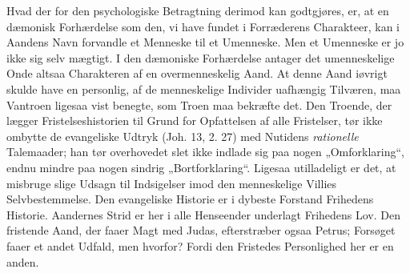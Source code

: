 \documentclass[12pt,a4paper]{book}
\begin{document}
Hvad der for den psychologiske Betragtning derimod kan godtgjøres, er, at en dæmonisk
Forhærdelse som den, vi have fundet i Forræderens Charakteer, kan i Aandens Navn forvandle et
Menneske til et Umenneske. Men et Umenneske er jo ikke sig selv mægtigt. I den dæmoniske
Forhærdelse antager det umenneskelige Onde altsaa Charakteren af en overmenneskelig Aand. At
denne Aand iøvrigt skulde have en personlig, af de menneskelige Individer uafhængig Tilværen,
maa Vantroen ligesaa vist benegte, som Troen maa bekræfte det. Den Troende, der lægger
Fristelseshistorien
til Grund for Opfattelsen af alle Fristelser, tør ikke ombytte de evangeliske Udtryk
(Joh. 13, 2. 27) med Nutidens \textit{rationelle} Talemaader; han tør overhovedet slet
ikke indlade sig paa nogen „Omforklaring“, endnu mindre paa nogen sindrig
„Bortforklaring“. Ligesaa utilladeligt er det, at misbruge slige Udsagn til Indsigelser
imod den menneskelige Villies Selvbestemmelse. Den evangeliske Historie er i dybeste
Forstand Frihedens Historie. Aandernes Strid er her i alle Henseender underlagt Frihedens
Lov. Den fristende Aand, der faaer Magt med Judas, efterstræber ogsaa Petrus; Forsøget
faaer et andet Udfald, men hvorfor? Fordi den Fristedes Personlighed her er en anden.
\end{document}
